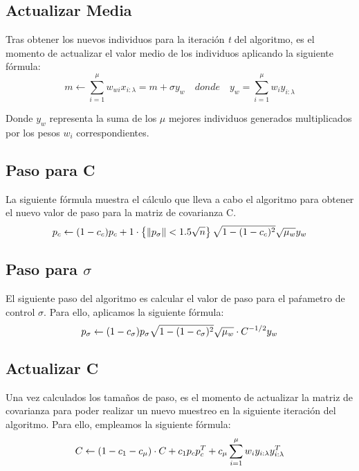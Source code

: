\subsection{Actualizar Media}
Tras obtener los nuevos individuos para la iteración \textit{t} del algoritmo, es el momento de actualizar el valor medio de los individuos aplicando la siguiente fórmula: 
\begin{equation} \label{eq:2}
    m \leftarrow \sum_{i=1}^{\mu} w_{wi}x_{i:\lambda} = m + \sigma y_{w}\quad donde\quad y_{w} = \sum_{i=1}^{\mu} w_{i}y_{i:\lambda} 
\end{equation}

Donde $y_{w}$ representa la suma de los $\mu$ mejores individuos generados multiplicados por los pesos $w_{i}$ correspondientes.

\subsection{Paso para C}
La siguiente fórmula muestra el cálculo que lleva a cabo el algoritmo para obtener el nuevo valor de paso para la matriz de covarianza C.
\begin{equation} \label{eq:3}
   p_{c} \leftarrow (1 - c_{c})p_{c} + 1\cdot\left \{ \left \|p_{\sigma}\right \|< 1.5 \sqrt{n} \right \} \sqrt{1 - (1 - c_{c})^2}\sqrt{\mu_{w}}y_{w} \\
\end{equation}


\subsection{Paso para $ \sigma $}
El siguiente paso del algoritmo es calcular el valor de paso para el paŕametro de control $\sigma$. Para ello, aplicamos la siguiente fórmula:
\begin{equation} \label{eq:4}
     p_{\sigma} \leftarrow (1 - c_{\sigma})p_{\sigma}\sqrt{1 - (1 - c_{\sigma})^2}\sqrt{\mu_{w}}\cdot C^{-1/2}y_{w} \\
\end{equation}

\subsection{Actualizar C}
Una vez calculados los tamaños de paso, es el momento de actualizar la matriz de covarianza para poder realizar un nuevo muestreo en la siguiente iteración del algoritmo. Para ello, empleamos la siguiente fórmula:
\begin{equation} \label{eq:5}
    C \leftarrow (1 - c_{1} - c_{\mu})\cdot C + c_{1}p_{c}p_{c}^{T} + c_{\mu} \sum_{i=1}^{\mu} w_{i}y_{i:\lambda}y_{i:\lambda}^{T} \\
\end{equation}

